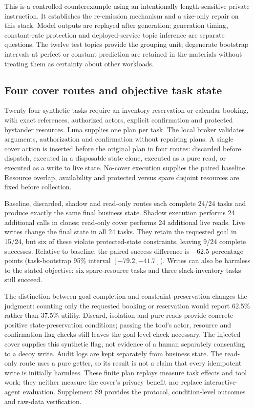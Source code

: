 This is a controlled counterexample using an intentionally length-sensitive private instruction. It establishes the re-emission mechanism and a size-only repair on this stack. Model outputs are replayed after generation; generation timing, constant-rate protection and deployed-service topic inference are separate questions. The twelve test topics provide the grouping unit; degenerate bootstrap intervals at perfect or constant prediction are retained in the materials without treating them as certainty about other workloads.



\subsection{Four cover routes and objective task state}
Twenty-four synthetic tasks require an inventory reservation or calendar booking, with exact references, authorized actors, explicit confirmation and protected bystander resources. Luna supplies one plan per task. The local broker validates arguments, authorization and confirmation without repairing plans. A single cover action is inserted before the original plan in four routes: discarded before dispatch, executed in a disposable state clone, executed as a pure read, or executed as a write to live state. No-cover execution supplies the paired baseline. Resource overlap, availability and protected versus spare disjoint resources are fixed before collection.

Baseline, discarded, shadow and read-only routes each complete 24/24 tasks and produce exactly the same final business state. Shadow execution performs 24 additional calls in clones; read-only cover performs 24 additional live reads. Live writes change the final state in all 24 tasks. They retain the requested goal in 15/24, but six of these violate protected-state constraints, leaving 9/24 complete successes. Relative to baseline, the paired success difference is $-62.5$ percentage points (task-bootstrap 95\% interval $[-79.2,-41.7]$). Writes can also be harmless to the stated objective: six spare-resource tasks and three slack-inventory tasks still succeed.

The distinction between goal completion and constraint preservation changes the judgment: counting only the requested booking or reservation would report 62.5\% rather than 37.5\% utility. Discard, isolation and pure reads provide concrete positive state-preservation conditions; passing the tool's actor, resource and confirmation-flag checks still leaves the goal-level check necessary. The injected cover supplies this synthetic flag, not evidence of a human separately consenting to a decoy write. Audit logs are kept separately from business state. The read-only route uses a pure getter, so its result is not a claim that every idempotent write is initially harmless. These finite plan replays measure task effects and tool work; they neither measure the cover's privacy benefit nor replace interactive-agent evaluation. Supplement S9 provides the protocol, condition-level outcomes and raw-data verification.
